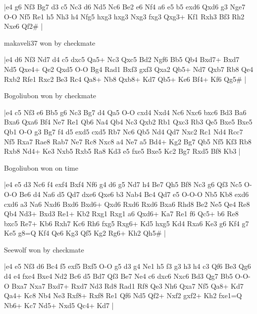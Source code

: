 \makegametitle
|e4 g6 Nf3 Bg7 d3 c5 Nc3 d6 Nd5 Nc6 Be2 e6 Nf4 a6 e5 b5 exd6 Qxd6 g3 Nge7 O-O Nf5 Re1 h5 Nh3 h4 Nfg5 hxg3 hxg3 Nxg3 fxg3 Qxg3+ Kf1 Rxh3 Bf3 Rh2 Nxe6 Qf2\#  |

\showboard

makaveli37 won by checkmate

\makegametitle
|e4 d6 Nf3 Nd7 d4 c5 dxc5 Qa5+ Nc3 Qxc5 Bd2 Ngf6 Bb5 Qb4 Bxd7+ Bxd7 Nd5 Qxe4+ Qe2 Qxd5 O-O Bg4 Rad1 Bxf3 gxf3 Qxa2 Qb5+ Nd7 Qxb7 Rb8 Qe4 Rxb2 Rfe1 Rxc2 Be3 Rc4 Qa8+ Nb8 Qxb8+ Kd7 Qb5+ Ke6 Bf4+ Kf6 Qg5\#  |

\showboard

Bogoliubon won by checkmate

\makegametitle
|e4 c5 Nf3 e6 Bb5 g6 Nc3 Bg7 d4 Qa5 O-O cxd4 Nxd4 Nc6 Nxc6 bxc6 Bd3 Ba6 Bxa6 Qxa6 Bf4 Ne7 Re1 Qb6 Na4 Qb4 Nc3 Qxb2 Rb1 Qxc3 Rb3 Qe5 Bxe5 Bxe5 Qb1 O-O g3 Bg7 f4 d5 exd5 cxd5 Rb7 Nc6 Qb5 Nd4 Qd7 Nxc2 Rc1 Nd4 Rcc7 Nf5 Rxa7 Rae8 Rab7 Ne7 Rc8 Nxc8 a4 Ne7 a5 Bd4+ Kg2 Bg7 Qb5 Nf5 Kf3 Rb8 Rxb8 Nd4+ Ke3 Nxb5 Rxb5 Ra8 Kd3 e5 fxe5 Bxe5 Kc2 Bg7 Rxd5 Bf8 Kb3  |

\showboard

Bogoliubon won on time

\makegametitle
|e4 e5 d3 Nc6 f4 exf4 Bxf4 Nf6 g4 d6 g5 Nd7 h4 Be7 Qh5 Bf8 Nc3 g6 Qf3 Nc5 O-O-O Be6 d4 Na6 d5 Qd7 dxe6 Qxe6 b3 Nab4 Bc4 Qd7 e5 O-O-O Nb5 Kb8 exd6 cxd6 a3 Na6 Nxd6 Bxd6 Bxd6+ Qxd6 Rxd6 Rxd6 Bxa6 Rhd8 Be2 Ne5 Qe4 Re8 Qb4 Nd3+ Bxd3 Re1+ Kb2 Rxg1 Rxg1 a6 Qxd6+ Ka7 Re1 f6 Qc5+ b6 Re8 bxc5 Re7+ Kb6 Rxh7 Kc6 Rh6 fxg5 Rxg6+ Kd5 hxg5 Kd4 Rxa6 Ke3 g6 Kf4 g7 Ke5 g8=Q Kf4 Qe6 Kg3 Qf5 Kg2 Rg6+ Kh2 Qh5\#  |

\showboard

Seewolf won by checkmate

\makegametitle
|e4 e5 Nf3 d6 Bc4 f5 exf5 Bxf5 O-O g5 d3 g4 Ne1 h5 f3 g3 h3 h4 c3 Qf6 Be3 Qg6 d4 e4 fxe4 Bxe4 Nd2 Bc6 d5 Bd7 Qf3 Be7 Ne4 c6 dxc6 Nxc6 Bd3 Qg7 Bb5 O-O-O Bxa7 Nxa7 Bxd7+ Rxd7 Nd3 Rd8 Rad1 Rf8 Qe3 Nh6 Qxa7 Nf5 Qa8+ Kd7 Qa4+ Kc8 Nb4 Ne3 Rxf8+ Rxf8 Re1 Qf6 Nd5 Qf2+ Nxf2 gxf2+ Kh2 fxe1=Q Nb6+ Kc7 Nd5+ Nxd5 Qc4+ Kd7  |


